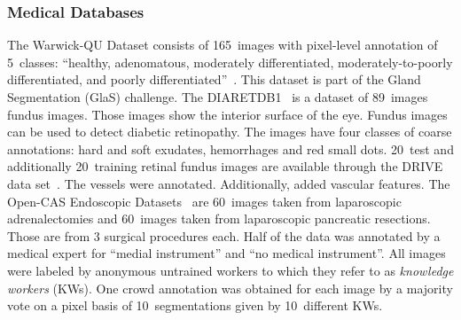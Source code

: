 \documentclass[technote,a4paper,leqno]{IEEEtran}
\begin{document}
\subsubsection{Medical Databases}
The Warwick-QU Dataset consists of 165~images with pixel-level annotation of
5~classes: \enquote{healthy, adenomatous, moderately differentiated,
moderately-to-poorly differentiated, and poorly
differentiated}~\cite{coelho2009nuclear}. This dataset is part of the
Gland Segmentation (GlaS) challenge.
The DIARETDB1~\cite{kalesnykiene2014diaretdb1} is a dataset of 89~images fundus
images. Those images show the interior surface of the eye. Fundus images can
be used to detect diabetic retinopathy. The images have four classes of coarse
annotations: hard and soft exudates, hemorrhages and red small dots.
20~test and additionally 20~training retinal fundus images are available
through the DRIVE data set~\cite{staal2004ridge}. The vessels were annotated.
Additionally, \cite{azzopardi2011detection} added vascular features.
The Open-CAS Endoscopic Datasets~\cite{maier2014can} are 60~images taken from
laparoscopic adrenalectomies and 60~images taken from laparoscopic pancreatic
resections. Those are from 3 surgical procedures each. Half of the data was
annotated by a medical expert for \enquote{medial instrument} and \enquote{no
medical instrument}. All images were labeled by anonymous untrained workers to
which they refer to as \textit{knowledge workers} (KWs). One crowd annotation
was obtained for each image by a majority vote on a pixel basis of
10~segmentations given by 10~different KWs.%
\end{document}
